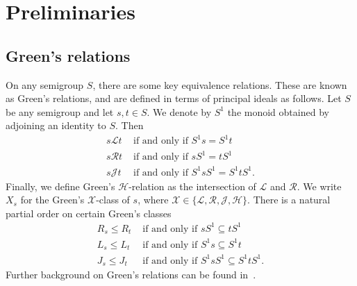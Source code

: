 \documentclass[11pt]{article}
\numberwithin{equation}{section}
\renewcommand{\L}{\mathscr{L}}
\newcommand{\R}{\mathscr{R}}
\newcommand{\J}{\mathscr{J}}
\renewcommand{\H}{\mathscr{H}}
\begin{document}
\section{Preliminaries}
\label{sec:Preliminaries}

\subsection{Green's relations}
On any semigroup $S$, there are some key equivalence relations. These are known
as Green's relations, and are defined in terms of principal ideals as follows.
Let $S$ be any semigroup and let $s, t \in S$. We denote by $S^1$ the monoid
obtained by adjoining an identity to $S$. Then
\begin{align*}
  s \L t &\text{ if and only if } S^1 s = S^1 t \\
  s \R t &\text{ if and only if } s S^1 = t S^1 \\
  s \J t &\text{ if and only if } S^1 s S^1 = S^1 t S^1.
\end{align*}
Finally, we define Green's $\H$-relation as the intersection of $\L$ and $\R$.
We write $X_s$ for the Green's $\mathcal{X}$-class of $s$, where
$\mathcal{X} \in \{\L, \R, \J, \H\}$.
There is a natural partial order on certain Green's classes
\begin{align*}
  R_s \leq R_t &\text{ if and only if } sS^1 \subseteq tS^1 \\
  L_s \leq L_t &\text{ if and only if } S^1s \subseteq S^1t \\
  J_s \leq J_t &\text{ if and only if } S^1 s S^1 \subseteq S^1 t S^1.
\end{align*}
Further background on Green's relations can be found in~\cite{Howie1995aa}.
\end{document}
